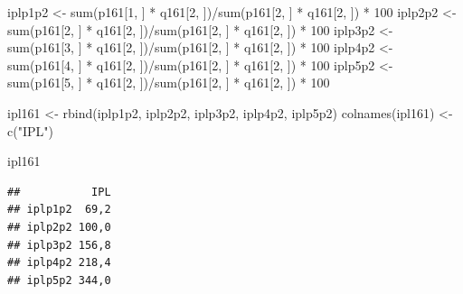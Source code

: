 \documentclass[
]{book}
\newenvironment{Shaded}{\begin{snugshade}}{\end{snugshade}}
\newcommand{\DecValTok}[1]{\textcolor[rgb]{0.00,0.00,0.81}{#1}}
\newcommand{\FunctionTok}[1]{\textcolor[rgb]{0.00,0.00,0.00}{#1}}
\newcommand{\NormalTok}[1]{#1}
\newcommand{\OtherTok}[1]{\textcolor[rgb]{0.56,0.35,0.01}{#1}}
\newcommand{\SpecialCharTok}[1]{\textcolor[rgb]{0.00,0.00,0.00}{#1}}
\newcommand{\StringTok}[1]{\textcolor[rgb]{0.31,0.60,0.02}{#1}}
\begin{document}
\begin{Shaded}
\begin{Highlighting}[]
\NormalTok{iplp1p2 }\OtherTok{\textless{}{-}} \FunctionTok{sum}\NormalTok{(p161[}\DecValTok{1}\NormalTok{, ] }\SpecialCharTok{*}\NormalTok{ q161[}\DecValTok{2}\NormalTok{, ])}\SpecialCharTok{/}\FunctionTok{sum}\NormalTok{(p161[}\DecValTok{2}\NormalTok{, ] }\SpecialCharTok{*} 
\NormalTok{    q161[}\DecValTok{2}\NormalTok{, ]) }\SpecialCharTok{*} \DecValTok{100}
\NormalTok{iplp2p2 }\OtherTok{\textless{}{-}} \FunctionTok{sum}\NormalTok{(p161[}\DecValTok{2}\NormalTok{, ] }\SpecialCharTok{*}\NormalTok{ q161[}\DecValTok{2}\NormalTok{, ])}\SpecialCharTok{/}\FunctionTok{sum}\NormalTok{(p161[}\DecValTok{2}\NormalTok{, ] }\SpecialCharTok{*} 
\NormalTok{    q161[}\DecValTok{2}\NormalTok{, ]) }\SpecialCharTok{*} \DecValTok{100}
\NormalTok{iplp3p2 }\OtherTok{\textless{}{-}} \FunctionTok{sum}\NormalTok{(p161[}\DecValTok{3}\NormalTok{, ] }\SpecialCharTok{*}\NormalTok{ q161[}\DecValTok{2}\NormalTok{, ])}\SpecialCharTok{/}\FunctionTok{sum}\NormalTok{(p161[}\DecValTok{2}\NormalTok{, ] }\SpecialCharTok{*} 
\NormalTok{    q161[}\DecValTok{2}\NormalTok{, ]) }\SpecialCharTok{*} \DecValTok{100}
\NormalTok{iplp4p2 }\OtherTok{\textless{}{-}} \FunctionTok{sum}\NormalTok{(p161[}\DecValTok{4}\NormalTok{, ] }\SpecialCharTok{*}\NormalTok{ q161[}\DecValTok{2}\NormalTok{, ])}\SpecialCharTok{/}\FunctionTok{sum}\NormalTok{(p161[}\DecValTok{2}\NormalTok{, ] }\SpecialCharTok{*} 
\NormalTok{    q161[}\DecValTok{2}\NormalTok{, ]) }\SpecialCharTok{*} \DecValTok{100}
\NormalTok{iplp5p2 }\OtherTok{\textless{}{-}} \FunctionTok{sum}\NormalTok{(p161[}\DecValTok{5}\NormalTok{, ] }\SpecialCharTok{*}\NormalTok{ q161[}\DecValTok{2}\NormalTok{, ])}\SpecialCharTok{/}\FunctionTok{sum}\NormalTok{(p161[}\DecValTok{2}\NormalTok{, ] }\SpecialCharTok{*} 
\NormalTok{    q161[}\DecValTok{2}\NormalTok{, ]) }\SpecialCharTok{*} \DecValTok{100}

\NormalTok{ipl161 }\OtherTok{\textless{}{-}} \FunctionTok{rbind}\NormalTok{(iplp1p2, iplp2p2, iplp3p2, iplp4p2, }
\NormalTok{    iplp5p2)}
\FunctionTok{colnames}\NormalTok{(ipl161) }\OtherTok{\textless{}{-}} \FunctionTok{c}\NormalTok{(}\StringTok{"IPL"}\NormalTok{)}

\NormalTok{ipl161}
\end{Highlighting}
\end{Shaded}

\begin{verbatim}
##           IPL
## iplp1p2  69,2
## iplp2p2 100,0
## iplp3p2 156,8
## iplp4p2 218,4
## iplp5p2 344,0
\end{verbatim}
\end{document}

